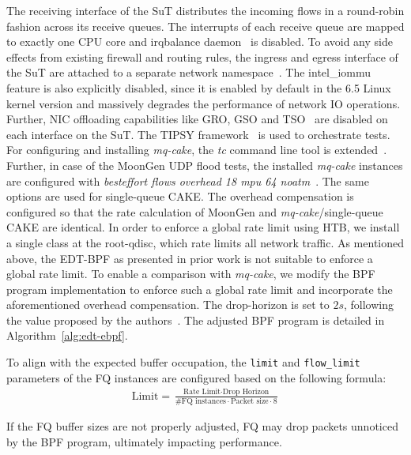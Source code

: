 The receiving interface of the SuT distributes the incoming flows in a round-robin fashion across its receive queues.
%
The interrupts of each receive queue are mapped to exactly one CPU core and irqbalance daemon~\cite{irqbalance} is disabled.
%
To avoid any side effects from existing firewall and routing rules, the ingress and egress interface of the SuT are attached to a separate network namespace~\cite{network-namespace}.
%
The intel\_iommu~\cite{iommu} feature is also explicitly disabled, since it is enabled by default in the 6.5 Linux kernel version and massively degrades the performance of network IO operations.
%
Further, NIC offloading capabilities like GRO, GSO and TSO~\cite{offloads} are disabled on each interface on the SuT.
%
The TIPSY framework~\cite{tipsy} is used to orchestrate tests.
%
For configuring and installing \textit{mq-cake}, the \textit{tc} command line tool is extended~\cite{mq-cake-iproute}.
%
Further, in case of the MoonGen UDP flood tests, the installed \textit{mq-cake} instances are configured with \textit{besteffort flows overhead 18 mpu 64 noatm}~\cite{cake-manual}.
%
The same options are used for single-queue CAKE.
%
The overhead compensation is configured so that the rate calculation of MoonGen and \textit{mq-cake}/single-queue CAKE are identical.
%
In order to enforce a global rate limit using HTB, we install a single class at the root-qdisc, which rate limits all network traffic.
%
As mentioned above, the EDT-BPF as presented in prior work is not suitable to enforce a global rate limit.
To enable a comparison with \textit{mq-cake}, we modify the BPF program implementation to enforce such a global rate limit and incorporate the aforementioned overhead compensation.
%
The drop-horizon is set to $2s$, following the value proposed by the authors~\cite{edt-ebpf}. The adjusted BPF program is detailed in Algorithm~\ref{alg:edt-ebpf}.

To align with the expected buffer occupation, the \lstinline{limit} and \lstinline{flow_limit} parameters of the FQ instances are configured based on the following formula:
\begin{align*}
    \text{Limit} = \frac{\text{Rate Limit}\cdot \text{Drop Horizon}}{\text{\# FQ instances}\cdot \text{Packet size} \cdot 8}
\end{align*}

If the FQ buffer sizes are not properly adjusted, FQ may drop packets unnoticed by the BPF program, ultimately impacting performance.

